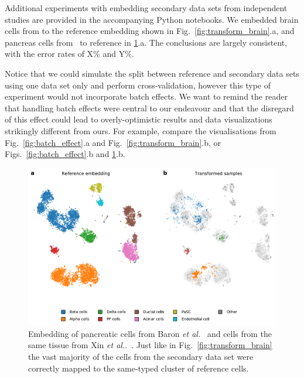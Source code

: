 \documentclass[runningheads]{llncs}
\newcommand{\etal}{\textit{et al.}}
\begin{document}
Additional experiments with embedding secondary data sets from independent
studies are provided in the accompanying Python notebooks. We embedded brain
cells from \cite{} to the reference embedding shown in
Fig.~\ref{fig:transform_brain}.a, and pancreas cells from~\cite{} to reference
in \ref{fig:transform_pancreas}.a. The conclusions are largely consistent, with the error rates 
of X\% and Y\%. 

Notice that we could simulate the split between reference and secondary data
sets using one data set only and perform cross-validation, however this type of experiment
would not incorporate batch effects. We want to remind the reader that handling
batch effects were central to our endeavour and that the disregard of this effect
could lead to overly-optimistic results and data visualizations strikingly different from ours. For example,
compare the visualisations from Fig.~\ref{fig:batch_effect}.a and
Fig.~\ref{fig:transform_brain}.b, or Figs.~\ref{fig:batch_effect}.b and
\ref{fig:transform_pancreas}.b.




\begin{figure}[htb]
\includegraphics[width=\textwidth]{figures/transform_pancreas.pdf}
\caption{Embedding of pancreatic cells from Baron \etal~\cite{baron2016} and
cells from the same tissue from Xin \etal.~\cite{xin2016}. Just like in
Fig.~\ref{fig:transform_brain} the vast majority of the cells from the secondary
data set were correctly mapped to the same-typed cluster of reference
cells.}\label{fig:transform_pancreas}
\end{figure}
\end{document}
